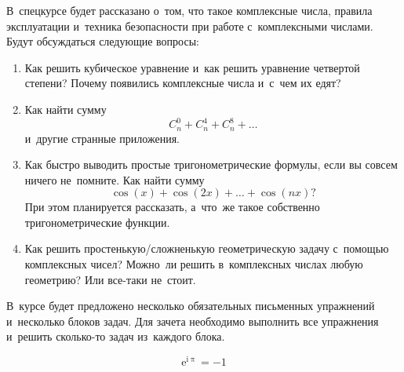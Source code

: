 



В~спецкурсе будет рассказано о~том, что такое комплексные числа, правила
эксплуатации и~техника безопасности при работе с~комплексными числами.
Будут обсуждаться следующие вопросы:
\begin{enumerate}
\item
Как решить кубическое уравнение и~как решить уравнение четвертой степени?
Почему появились комплексные числа и~с~чем их едят?
\item
Как найти сумму
\[
    C_{n}^{0} + C_{n}^{4} + C_{n}^{8} + \ldots
\]
и~другие странные приложения.
\item
Как быстро выводить простые тригонометрические формулы, если вы совсем ничего
не~помните.
Как найти сумму
\[
    \cos(x) + \cos(2 x) + \ldots + \cos(n x)
? \]
При этом планируется рассказать, а~что~же такое собственно тригонометрические
функции.
\item
Как решить простенькую/сложненькую геометрическую задачу с~помощью комплексных
чисел?
Можно~ли решить в~комплексных числах любую геометрию?
Или все-таки не~стоит.
\end{enumerate}

В~курсе будет предложено несколько обязательных письменных упражнений
и~несколько блоков задач.
Для зачета необходимо выполнить все упражнения и~решить сколько-то задач
из~каждого блока.

\begingroup\Huge
    \ifdefined\mathup
        \def\piconst{\mathup{\pi}}%
    \else
        \def\piconst{\uppi}%
    \fi
    \[ \mathrm{e}^{\mathrm{i} \piconst} = -1 \]
\endgroup

